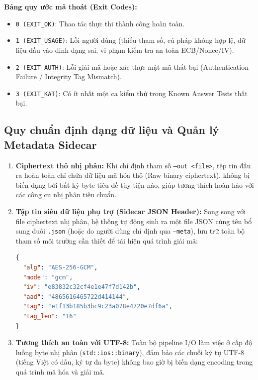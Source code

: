 \documentclass[12pt, a4paper]{report}
\begin{document}
\textbf{Bảng quy ước mã thoát (Exit Codes):}
\begin{itemize}
    \item \texttt{0 (EXIT\_OK)}: Thao tác thực thi thành công hoàn toàn.
    \item \texttt{1 (EXIT\_USAGE)}: Lỗi người dùng (thiếu tham số, cú pháp không hợp lệ, dữ liệu đầu vào định dạng sai, vi phạm kiểm tra an toàn ECB/Nonce/IV).
    \item \texttt{2 (EXIT\_AUTH)}: Lỗi giải mã hoặc xác thực mật mã thất bại (Authentication Failure / Integrity Tag Mismatch).
    \item \texttt{3 (EXIT\_KAT)}: Có ít nhất một ca kiểm thử trong Known Answer Tests thất bại.
\end{itemize}

\subsection{Quy chuẩn định dạng dữ liệu và Quản lý Metadata Sidecar}
\begin{enumerate}
    \item \textbf{Ciphertext thô nhị phân:} Khi chỉ định tham số \texttt{--out <file>}, tệp tin đầu ra hoàn toàn chỉ chứa dữ liệu mã hóa thô (Raw binary ciphertext), không bị biến dạng bởi bất kỳ byte tiêu đề tùy tiện nào, giúp tương thích hoàn hảo với các công cụ nhị phân tiêu chuẩn.
    \item \textbf{Tập tin siêu dữ liệu phụ trợ (Sidecar JSON Header):} Song song với file ciphertext nhị phân, hệ thống tự động sinh ra một file JSON cùng tên bổ sung đuôi \texttt{.json} (hoặc do người dùng chỉ định qua \texttt{--meta}), lưu trữ toàn bộ tham số môi trường cần thiết để tái hiện quá trình giải mã:
\begin{lstlisting}[language=json, caption={Mẫu tập tin Sidecar JSON sinh ra từ GCM mode}]
{
  "alg": "AES-256-GCM",
  "mode": "gcm",
  "iv": "e83832c32cf4e1e47f7d142b",
  "aad": "4865616465722d414144",
  "tag": "e1f13b185b3bc9c23a078e4720e7df6a",
  "tag_len": "16"
}
\end{lstlisting}
    \item \textbf{Tương thích an toàn với UTF-8:} Toàn bộ pipeline I/O làm việc ở cấp độ luồng byte nhị phân (\texttt{std::ios::binary}), đảm bảo các chuỗi ký tự UTF-8 (tiếng Việt có dấu, ký tự đa byte) không bao giờ bị biến dạng encoding trong quá trình mã hóa và giải mã.
\end{enumerate}
\end{document}
